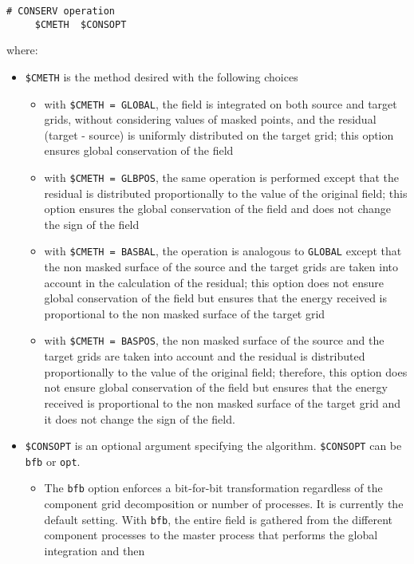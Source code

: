\begin{itemize}
 \begin{verbatim}
# CONSERV operation
     $CMETH  $CONSOPT
\end{verbatim}
  \vspace{-0.5cm} where:
  \begin{itemize}
  \item {\tt \$CMETH} is the method desired with the following choices
    \begin{itemize}
    \item with {\tt \$CMETH = GLOBAL}, the field is integrated on both
      source and target grids, without considering values of masked
      points, and the residual (target - source) is uniformly
      distributed on the target grid; this option ensures global
      conservation of the field
    \item with {\tt \$CMETH = GLBPOS}, the same operation is performed
      except that the residual is distributed proportionally to the
      value of the original field; this option ensures the global
      conservation of the field and does not change the sign of the
      field
    \item with {\tt \$CMETH = BASBAL}, the operation is analogous to
      {\tt GLOBAL} except that the non masked surface of the source
      and the target grids are taken into account in the calculation
      of the residual; this option does not ensure global conservation
      of the field but ensures that the energy received is
      proportional to the non masked surface of the target grid
    \item with {\tt \$CMETH = BASPOS}, the non masked surface of the
      source and the target grids are taken into account and the
      residual is distributed proportionally to the value of the
      original field; therefore, this option does not ensure global
      conservation of the field but ensures that the energy received
      is proportional to the non masked surface of the target grid and
      it does not change the sign of the field.
    \end{itemize}
  \item {\tt \$CONSOPT} is an optional argument specifying the
    algorithm.  {\tt \$CONSOPT} can be {\tt bfb} or {\tt opt}.  
\begin{itemize}
\item The {\tt bfb} option enforces a bit-for-bit transformation regardless
    of the component grid decomposition or number of processes. It is currently the default setting. 
With {\tt bfb}, the entire field is gathered from the different component processes to the master process that performs the global integration and then 

\end{itemize}
\end{itemize}
\end{itemize}
